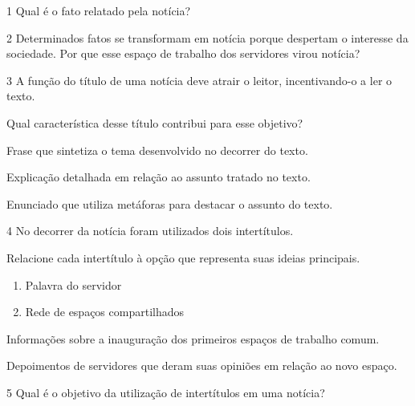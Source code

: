 \num{1} Qual é o fato relatado pela notícia?


\num{2} Determinados fatos se transformam em notícia porque despertam o
interesse da sociedade. Por que esse espaço de trabalho dos servidores
virou notícia?


\num{3} A função do título de uma notícia deve atrair o leitor,
incentivando-o a ler o texto.

Qual característica desse título contribui para esse objetivo?

\begin{boxlist}
 Frase que sintetiza o tema desenvolvido no decorrer do texto.

 Explicação detalhada em relação ao assunto tratado no texto.

 Enunciado que utiliza metáforas para destacar o assunto do texto.
\end{boxlist}

\num{4} No decorrer da notícia foram utilizados dois intertítulos.

Relacione cada intertítulo à opção que representa suas ideias principais.

\begin{enumerate}
\item Palavra do servidor

\item Rede de espaços compartilhados
\end{enumerate}

\begin{boxlist}
 Informações sobre a inauguração dos primeiros espaços de trabalho comum.

 Depoimentos de servidores que deram suas opiniões em relação ao novo espaço.
\end{boxlist}

\num{5} Qual é o objetivo da utilização de intertítulos em uma notícia?


